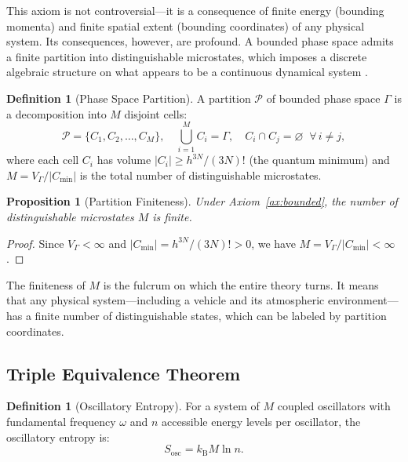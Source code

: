 \documentclass[twocolumn,10pt]{article}
\newtheorem{proposition}[theorem]{Proposition}
\theoremstyle{definition}
\newtheorem{definition}[theorem]{Definition}
\theoremstyle{remark}
\newcommand{\Sosc}{S_{\mathrm{osc}}}
\newcommand{\kB}{k_{\mathrm{B}}}
\newcommand{\VGamma}{V_{\Gamma}}
\begin{document}
This axiom is not controversial---it is a consequence of finite energy (bounding momenta) and finite spatial extent (bounding coordinates) of any physical system. Its consequences, however, are profound. A bounded phase space admits a finite partition into distinguishable microstates, which imposes a discrete algebraic structure on what appears to be a continuous dynamical system \cite{sachikonye2026partition, sachikonye2026poincare}.

\begin{definition}[Phase Space Partition]
\label{def:partition}
A partition $\mathcal{P}$ of bounded phase space $\Gamma$ is a decomposition into $M$ disjoint cells:
\begin{equation}
  \mathcal{P} = \{C_1, C_2, \ldots, C_M\}, \quad \bigcup_{i=1}^{M} C_i = \Gamma, \quad C_i \cap C_j = \varnothing \;\; \forall\, i \neq j,
  \label{eq:partition_def}
\end{equation}
where each cell $C_i$ has volume $|C_i| \geq h^{3N}/(3N)!$ (the quantum minimum) and $M = \VGamma / |C_{\min}|$ is the total number of distinguishable microstates.
\end{definition}

\begin{proposition}[Partition Finiteness]
\label{prop:finite_partition}
Under Axiom~\ref{ax:bounded}, the number of distinguishable microstates $M$ is finite.
\end{proposition}

\begin{proof}
Since $\VGamma < \infty$ and $|C_{\min}| = h^{3N}/(3N)! > 0$, we have $M = \VGamma / |C_{\min}| < \infty$.
\end{proof}

The finiteness of $M$ is the fulcrum on which the entire theory turns. It means that any physical system---including a vehicle and its atmospheric environment---has a finite number of distinguishable states, which can be labeled by partition coordinates.

\subsection{Triple Equivalence Theorem}

\begin{definition}[Oscillatory Entropy]
\label{def:osc_entropy}
For a system of $M$ coupled oscillators with fundamental frequency $\omega$ and $n$ accessible energy levels per oscillator, the oscillatory entropy is:
\begin{equation}
  \Sosc = \kB M \ln n.
  \label{eq:sosc}
\end{equation}
\end{definition}
\end{document}
